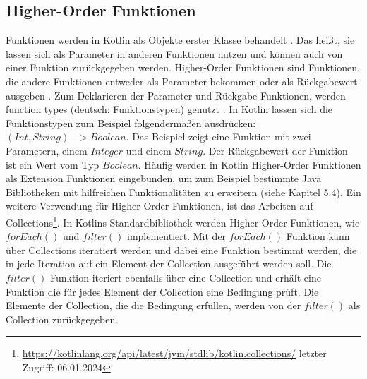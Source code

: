 \documentclass{article}
\begin{document}
\subsection{Higher-Order Funktionen}
Funktionen werden in Kotlin als Objekte erster Klasse behandelt \cite{KotlinLangDocHigherOrder}. Das heißt, sie lassen sich als Parameter in anderen Funktionen nutzen und können auch von einer Funktion zurückgegeben werden. Higher-Order Funktionen sind Funktionen, die andere Funktionen entweder als Parameter bekommen oder als Rückgabewert ausgeben \cite{KotlinLangDocHigherOrder}. Zum Deklarieren der Parameter und Rückgabe Funktionen, werden function types (deutsch: Funktionstypen) genutzt \cite{KotlinLangDocHigherOrder}. In Kotlin lassen sich die Funktionstypen zum Beispiel folgendermaßen ausdrücken: $(Int, String) -> Boolean$. Das Beispiel zeigt eine Funktion mit zwei Parametern, einem $Integer$ und einem $String$. Der Rückgabewert der Funktion ist ein Wert vom Typ $Boolean$. Häufig werden in Kotlin Higher-Order Funktionen als Extension Funktionen eingebunden, um zum Beispiel bestimmte Java Bibliotheken mit hilfreichen Funktionalitäten zu erweitern (siehe Kapitel 5.4). Ein weitere Verwendung für Higher-Order Funktionen, ist das Arbeiten auf Collections\footnote{\url{https://kotlinlang.org/api/latest/jvm/stdlib/kotlin.collections/} letzter Zugriff: 06.01.2024}. In Kotlins Standardbibliothek werden Higher-Order Funktionen, wie $forEach()$ und $filter()$ implementiert. Mit der $forEach()$ Funktion kann über Collections iteratiert werden und dabei eine Funktion bestimmt werden, die in jede Iteration auf ein Element der Collection ausgeführt werden soll. Die $filter()$ Funktion iteriert ebenfalls über eine Collection und erhält eine Funktion die für jedes Element der Collection eine Bedingung prüft. Die Elemente der Collection, die die Bedingung erfüllen, werden von der $filter()$ als Collection zurückgegeben.
\end{document}
